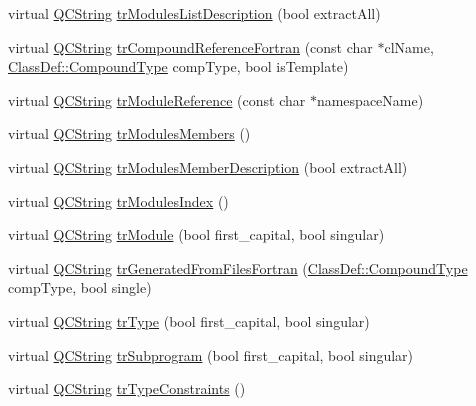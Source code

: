 \begin{DoxyCompactItemize}
\item 
virtual \hyperlink{class_q_c_string}{Q\-C\-String} \hyperlink{class_translator_russian_a4f1ad06ac7478b9058d7f388a2b67566}{tr\-Modules\-List\-Description} (bool extract\-All)
\item 
virtual \hyperlink{class_q_c_string}{Q\-C\-String} \hyperlink{class_translator_russian_a79d39414275f1cacb484f78806a65869}{tr\-Compound\-Reference\-Fortran} (const char $\ast$cl\-Name, \hyperlink{class_class_def_a768a6f0a6fd7e9087ff7971abbcc3f36}{Class\-Def\-::\-Compound\-Type} comp\-Type, bool is\-Template)
\item 
virtual \hyperlink{class_q_c_string}{Q\-C\-String} \hyperlink{class_translator_russian_a5b0385db8ce8e7c8251e31867c6fa8d5}{tr\-Module\-Reference} (const char $\ast$namespace\-Name)
\item 
virtual \hyperlink{class_q_c_string}{Q\-C\-String} \hyperlink{class_translator_russian_a75279d9914e0cc54ee5f4b15ddaa234c}{tr\-Modules\-Members} ()
\item 
virtual \hyperlink{class_q_c_string}{Q\-C\-String} \hyperlink{class_translator_russian_a26dd0f47c7f59841f901da7f4bd19306}{tr\-Modules\-Member\-Description} (bool extract\-All)
\item 
virtual \hyperlink{class_q_c_string}{Q\-C\-String} \hyperlink{class_translator_russian_a8a71cbe9e0669d3555731c3ebc0aae35}{tr\-Modules\-Index} ()
\item 
virtual \hyperlink{class_q_c_string}{Q\-C\-String} \hyperlink{class_translator_russian_a894e0b632e1680e918c78fea5b9b5384}{tr\-Module} (bool first\-\_\-capital, bool singular)
\item 
virtual \hyperlink{class_q_c_string}{Q\-C\-String} \hyperlink{class_translator_russian_ab89226b80b72b0ff8f4fca99626097ba}{tr\-Generated\-From\-Files\-Fortran} (\hyperlink{class_class_def_a768a6f0a6fd7e9087ff7971abbcc3f36}{Class\-Def\-::\-Compound\-Type} comp\-Type, bool single)
\item 
virtual \hyperlink{class_q_c_string}{Q\-C\-String} \hyperlink{class_translator_russian_a2763a6af55d1ca03be54604c2bc4a3b4}{tr\-Type} (bool first\-\_\-capital, bool singular)
\item 
virtual \hyperlink{class_q_c_string}{Q\-C\-String} \hyperlink{class_translator_russian_aeceda8d8c2b8645fd2337cb38d293269}{tr\-Subprogram} (bool first\-\_\-capital, bool singular)
\item 
virtual \hyperlink{class_q_c_string}{Q\-C\-String} \hyperlink{class_translator_russian_a196f3eb690f2748ee71f518cf02bd7fe}{tr\-Type\-Constraints} ()

\end{DoxyCompactItemize}
